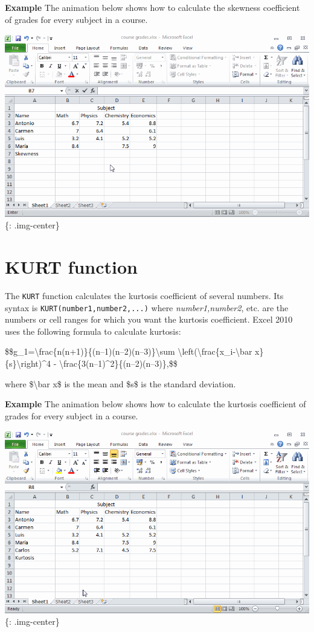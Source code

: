 \textbf{Example} The animation below shows how to calculate the skewness coefficient of grades for every subject in a course.

\includegraphics[keepaspectratio,width=\textwidth,height=0.75\textheight]{img/example_function_skew.gif}
\{: .img-center\}

\section{KURT function}
\label{kurtfunction}

The \texttt{KURT} function calculates the kurtosis coefficient of several numbers. Its syntax is \texttt{KURT(number1,number2,...)} where \emph{number1,number2}, etc. are the numbers or cell ranges for which you want the kurtosis coefficient. Excel 2010 uses the following formula to calculate kurtosis:

\$\$g\_1=\textbackslash{}frac\{n(n+1)\}\{(n--1)(n--2)(n--3)\}\textbackslash{}sum \textbackslash{}left(\textbackslash{}frac\{x\_i-\textbackslash{}bar x\}\{s\}\textbackslash{}right)\^{}4 - \textbackslash{}frac\{3(n--1)\^{}2\}\{(n--2)(n--3)\},\$\$

where \$\textbackslash{}bar x\$ is the mean and \$s\$ is the standard deviation. 

\textbf{Example} The animation below shows how to calculate the kurtosis coefficient of grades for every subject in a course.

\includegraphics[keepaspectratio,width=\textwidth,height=0.75\textheight]{img/example_function_kurt.gif}
\{: .img-center\}


